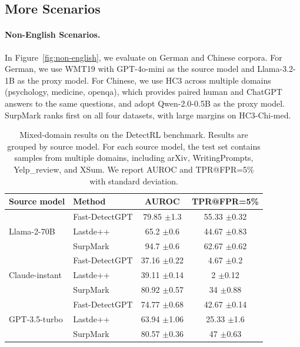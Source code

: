 \documentclass{article}
\newcommand{\com}[1]{\tiny$\pm$#1}
\theoremstyle{plain}
\theoremstyle{definition}
\theoremstyle{remark}
\begin{document}
\subsection{More Scenarios}
\vspace{-2mm}
\paragraph{Non-English Scenarios.} In Figure~\ref{fig:non-english}, we evaluate on German and Chinese corpora. For German, we use WMT19 with GPT-4o-mini as the source model and Llama-3.2-1B as the proxy model. For Chinese, we use HC3 across multiple domains (psychology, medicine, openqa), which provides paired human and ChatGPT answers to the same questions, and adopt Qwen-2.0-0.5B as the proxy model. SurpMark ranks first on all four datasets, with large margins on HC3-Chi-med.
\vspace{-2mm}
\begin{table}[t]
\centering
\caption{Mixed-domain results on the DetectRL benchmark. Results are grouped by source model. For each source model, the test set contains samples from multiple domains, including arXiv, WritingPrompts, Yelp\_review, and XSum. We report AUROC and TPR@FPR=5\% with standard deviation.}
\label{tab:mix_domain}
{\scriptsize
\begin{tabular}{llcc}
\toprule
Source model & Method & AUROC & TPR@FPR=5\% \\
\midrule
\multirow{3}{*}{Llama-2-70B}
& Fast-DetectGPT & 79.85 \com 1.3 & 55.33 \com 0.32 \\
& Lastde++ & 65.2 \com 0.6 & 44.67 \com 0.83 \\
& \cellcolor{ours} SurpMark & \cellcolor{ours} 94.7 \com 0.6 & \cellcolor{ours} 62.67 \com 0.62 \\
\midrule
\multirow{3}{*}{Claude-instant}
& Fast-DetectGPT & 37.16 \com 0.22 & 4.67 \com 0.2 \\
& Lastde++ & 39.11 \com 0.14 & 2 \com 0.12 \\
& \cellcolor{ours} SurpMark & \cellcolor{ours} 80.92 \com 0.57 & \cellcolor{ours} 34 \com 0.88 \\
\midrule
\multirow{3}{*}{GPT-3.5-turbo}
& Fast-DetectGPT & 74.77 \com 0.68 & 42.67 \com 0.14 \\
& Lastde++ & 63.94 \com 1.06 & 25.33 \com 1.6 \\
& \cellcolor{ours} SurpMark & \cellcolor{ours} 80.57 \com 0.36 & \cellcolor{ours} 47 \com 0.63 \\
\bottomrule
\end{tabular}
}
\end{table}
\end{document}
